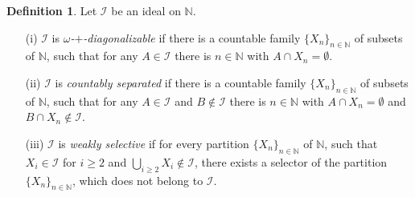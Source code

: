 \documentclass{amsart}
\theoremstyle{definition}
\newtheorem{df}[thm]{Definition}
\theoremstyle{definition}
\newcommand{\N}{{\mathbb N}}
\newcommand{\I}{\mathcal I}
\begin{document}
\begin{df} Let $\mathcal{I}$ be an ideal on $\N$.
\begin{enumerate}
\item[(i)] $\mathcal{I}$ is \emph{$\omega$-$+$-diagonalizable} if there is a countable family $\{X_n\}_{n\in\N}$ of subsets of $\N$, such that for any $A\in \mathcal{I}$ there is $n\in\N$ with $A\cap X_n=\emptyset$.
\item[(ii)] $\mathcal{I}$ is \emph{countably separated} if there is a countable family $\{X_n\}_{n\in\N}$ of subsets of $\N$, such that for any $A\in \mathcal{I}$ and $B\notin \mathcal{I}$ there is $n\in\N$ with $A\cap X_n=\emptyset$ and $B\cap X_n\notin \mathcal{I}$. %
\item[(iii)] $\mathcal{I}$ is \emph{weakly selective} if for every partition $\{X_n\}_{n\in\N}$ of $\N$, such that $X_i\in\I$ for $i\geq 2$ and $\bigcup_{i\geq 2}{X_i} \notin\I$, there exists a selector of the partition $\{X_n\}_{n\in\N}$, which does not belong to $\I$.
\end{enumerate}
\end{df}
\end{document}
